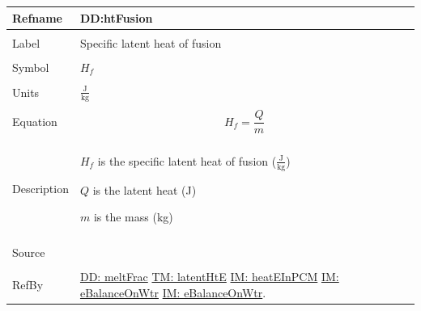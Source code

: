 \documentclass[12pt]{article}
\begin{document}
\noindent \begin{minipage}{\textwidth}
\begin{tabular}{p{} p{}}
\toprule \textbf{Refname} & \textbf{DD:htFusion}
\label{DD:htFusion}
\\ \midrule \\
Label & Specific latent heat of fusion
\\ \midrule \\
Symbol & ${H_{f}}$
\\ \midrule \\
Units & $\frac{\text{J}}{\text{kg}}$
\\ \midrule \\
Equation & \begin{displaymath}
           {H_{f}}=\frac{Q}{m}
           \end{displaymath}
\\ \midrule \\
Description & \begin{symbDescription}
              \item{${H_{f}}$ is the specific latent heat of fusion ($\frac{\text{J}}{\text{kg}}$)}
              \item{$Q$ is the latent heat (J)}
              \item{$m$ is the mass (kg)}
              \end{symbDescription}
\\ \midrule \\
Source & \cite[(pg. 282)]{bueche1986}
\\ \midrule \\
RefBy & \hyperref[DD:meltFrac]{DD: meltFrac} \hyperref[TM:latentHtE]{TM: latentHtE} \hyperref[IM:heatEInPCM]{IM: heatEInPCM} \hyperref[IM:eBalanceOnWtr]{IM: eBalanceOnWtr} \hyperref[IM:eBalanceOnWtr]{IM: eBalanceOnWtr}.
\\ \bottomrule \end{tabular}
\end{minipage}
\par~
\end{document}
